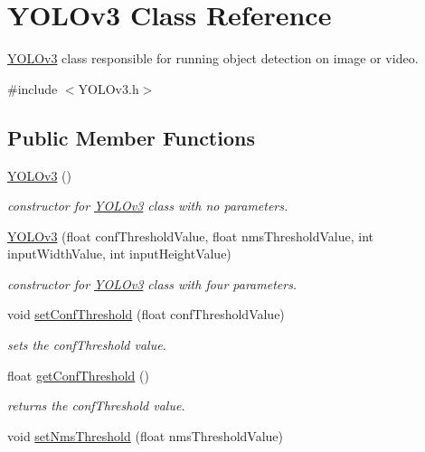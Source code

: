 \hypertarget{classYOLOv3}{}\section{Y\+O\+L\+Ov3 Class Reference}
\label{classYOLOv3}


\hyperlink{classYOLOv3}{Y\+O\+L\+Ov3} class responsible for running object detection on image or video.  




{\ttfamily \#include $<$Y\+O\+L\+Ov3.\+h$>$}

\subsection*{Public Member Functions}
\begin{DoxyCompactItemize}
\item 
\hyperlink{classYOLOv3_a2eda4ad08dd4943ed8fdab8483c5b521}{Y\+O\+L\+Ov3} ()
\begin{DoxyCompactList}\small\item\em constructor for \hyperlink{classYOLOv3}{Y\+O\+L\+Ov3} class with no parameters. \end{DoxyCompactList}\item 
\hyperlink{classYOLOv3_a7fa8e4ed04b80302514c75eec94220de}{Y\+O\+L\+Ov3} (float conf\+Threshold\+Value, float nms\+Threshold\+Value, int input\+Width\+Value, int input\+Height\+Value)
\begin{DoxyCompactList}\small\item\em constructor for \hyperlink{classYOLOv3}{Y\+O\+L\+Ov3} class with four parameters. \end{DoxyCompactList}\item 
void \hyperlink{classYOLOv3_ad1bcc51e21096d6b4610a7b2a1634d68}{set\+Conf\+Threshold} (float conf\+Threshold\+Value)
\begin{DoxyCompactList}\small\item\em sets the conf\+Threshold value. \end{DoxyCompactList}\item 
float \hyperlink{classYOLOv3_a7ccd356ee74387ce640dcce310f2fd47}{get\+Conf\+Threshold} ()
\begin{DoxyCompactList}\small\item\em returns the conf\+Threshold value. \end{DoxyCompactList}\item 
void \hyperlink{classYOLOv3_a7949ba1cf8826a84f6a26184af8ff60f}{set\+Nms\+Threshold} (float nms\+Threshold\+Value)

\end{DoxyCompactItemize}
